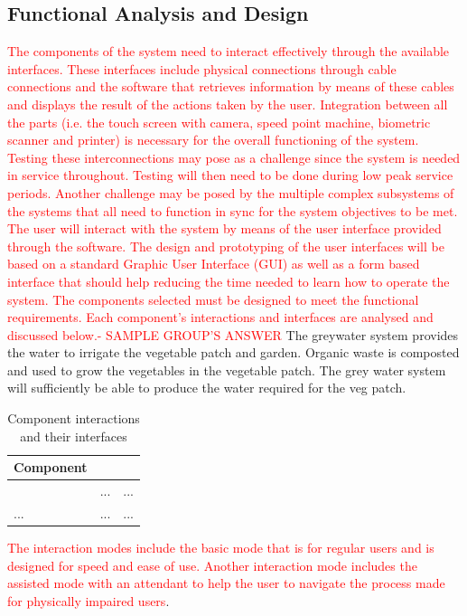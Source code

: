 \documentclass[a4paper,11pt,fleqn]{report}
\begin{document}
\subsection{Functional Analysis and Design}
\textcolor{red}{The components of the system need to interact effectively through the available interfaces. These interfaces include physical connections through cable connections and the software that retrieves information by means of these cables and displays the result of the actions taken by the user. Integration between all the parts (i.e. the touch screen with camera, speed point machine, biometric scanner and printer) is necessary for the overall functioning of the system. Testing these interconnections may pose as a challenge since the system is needed in service throughout. Testing will then need to be done during low peak service periods. Another challenge may be posed by the multiple complex subsystems of the systems that all need to function in sync for the system objectives to be met. The user will interact with the system by means of the user interface provided through the software. The design and prototyping of the user interfaces will be based on a standard Graphic User Interface (GUI) as well as a form based interface that should help reducing the time needed to learn how to operate the system.
The components selected must be designed to meet the functional requirements. Each component’s interactions and interfaces are analysed and discussed below.- SAMPLE GROUP'S ANSWER}
The greywater system provides the water to irrigate the vegetable patch and garden. Organic waste is composted  and used to grow the vegetables in the vegetable patch. The grey water system will sufficiently be able to produce the water required for the veg patch.

%
\begin{table}[h!]
\caption {Component interactions and their interfaces} \label{tb: Components & interfaces} 
\begin{center}
\begin{tabular}{p{4cm}|p{4cm}|p{4cm}}\toprule
	{\textbf{Component}} & {\textbf{Interaction} & {\textbf{Interface}\\ \midrule
    \textcolor{Format used by sample project} & ... & ...\\
    \hline
    ... & ... & ...\\

    \bottomrule
\end{tabular}
\end{center}
\end{table}
%
\textcolor{red}{The interaction modes include the basic mode that is for regular users and is designed for speed and ease of use. Another interaction mode includes the assisted mode with an attendant to help the user to navigate the process made for physically impaired users}.
\end{document}
